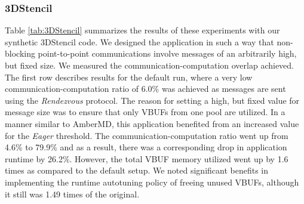 \begin{table}[!tbp]
  \centering
  \small
  \captionsetup{justification=centering}
  \caption{SNAP: Impact of Eager threshold and autotuning}
  \label{tab:SNAP}
\end{table}
\subsubsection{3DStencil}
Table \ref{tab:3DStencil} summarizes the results of these experiments with our synthetic 3DStencil code. We designed the application in such a way that non-blocking point-to-point communications involve messages of an arbitrarily high, but fixed size. We measured the communication-computation overlap achieved. The first row describes results for the default run, where a very low communication-computation ratio of 6.0\% was achieved as messages are sent using the \emph{Rendezvous} protocol. The reason for setting a high, but fixed value for message size was to ensure that only VBUFs from one pool are utilized. In a manner similar to AmberMD, this application benefited from an increased value for the \emph{Eager} threshold. The communication-computation ratio went up from 4.6\% to 79.9\% and as a result, there was a corresponding drop in application runtime by 26.2\%. However, the total VBUF memory utilized went up by 1.6 times as compared to the default setup. We noted significant benefits in implementing the runtime autotuning policy of freeing unused VBUFs, although it still was 1.49 times of the original. \par

